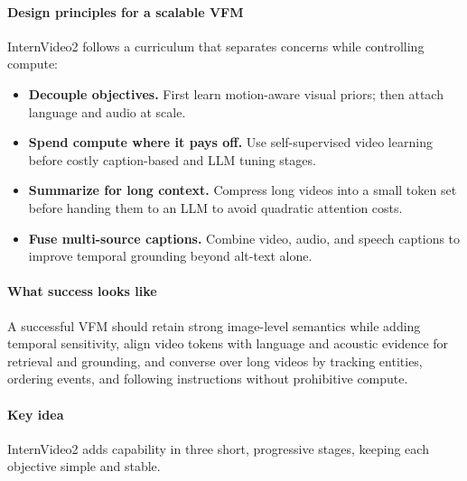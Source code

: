 \begin{enrichment}
\begin{enrichment}
        \paragraph{Design principles for a scalable VFM}
        InternVideo2 follows a curriculum that separates concerns while controlling compute:
        \begin{itemize}
            \item \textbf{Decouple objectives.} First learn motion-aware visual priors; then attach language and audio at scale.
            \item \textbf{Spend compute where it pays off.} Use self-supervised video learning before costly caption-based and LLM tuning stages.
            \item \textbf{Summarize for long context.} Compress long videos into a small token set before handing them to an LLM to avoid quadratic attention costs.
            \item \textbf{Fuse multi-source captions.} Combine video, audio, and speech captions to improve temporal grounding beyond alt-text alone.
        \end{itemize}
        
        \paragraph{What success looks like}
        A successful VFM should retain strong image-level semantics while adding temporal sensitivity, align video tokens with language and acoustic evidence for retrieval and grounding, and converse over long videos by tracking entities, ordering events, and following instructions without prohibitive compute.
        
        \newpage
        
        \paragraph{Key idea}
        InternVideo2 adds capability in three short, progressive stages, keeping each objective simple and stable.
        

\end{enrichment}
\end{enrichment}
